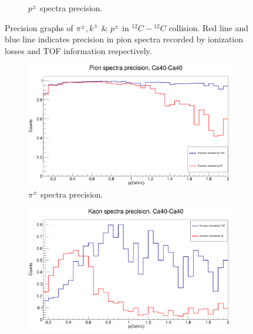 \documentclass[12pt, twocolumn]{article}
\begin{document}
\begin{figure}[H]
\begin{subfigure}[h]{0.49\textwidth}
\caption{$p^{\pm}$ spectra precision.}
\label{Proton spectra precision, C12}
\end{subfigure}
\caption{Precision graphs of $\pi^{\pm}, k^{\pm}$ $\&$ $p^{\pm}$ in $^{12}C-{^{12}C}$ collision. Red line and blue line indicates precision in pion spectra recorded by ionization losses and TOF information respectively.}
\label{Precision graphs of pions, kaons, and protons in C12-C12 collision. Red line and blue line shows precision in pion spectra recorded by ST, and TOF respectively.}
\vspace{2.5cm}
\end{figure}


\begin{figure}[H]
\centering
\begin{subfigure}[h]{0.49\textwidth}
\centering
\includegraphics[scale=0.14]{PionSpectraPrecision_Ca.png}
\caption{$\pi^{\pm}$ spectra precision.}
\label{Pion spectra precision, Ca40.}
\end{subfigure}
\par
\vspace{1.3cm}
\begin{subfigure}[h]{0.49\textwidth}
\centering
\includegraphics[scale=0.14]{KaonSpectraPrecision_Ca.png}

\end{subfigure}
\end{figure}
\end{document}
